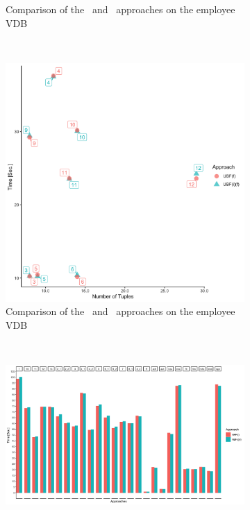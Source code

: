 \begin{figure}[t!]
\begin{subfigure}[t]{0.5\textwidth}
        \caption[Comparison of the \ubff\ and \ubfif\ approaches on the employee VDB]{Comparison of the \ubff\ and \ubfif\ approaches on the employee VDB}
    \end{subfigure}%
    ~ 
    \begin{subfigure}[t]{0.5\textwidth}
        \centering
        \includegraphics[scale=0.06]{figs/plots/emp-ubf-f-scatter.png}
        \caption[Comparison of the \ubff\ and \ubfif\ approaches on the employee VDB]{Comparison of the \ubff\ and \ubfif\ approaches on the employee VDB}
    \end{subfigure}\\[1 ex]
    \begin{subfigure}[t]{0.5\textwidth}
        \centering
        \includegraphics[width=\textwidth]{figs/plots/enron-nbf-f.png}

\end{subfigure}
\end{figure}
